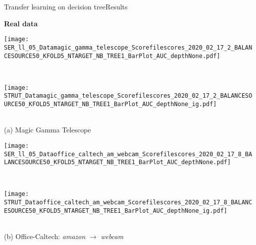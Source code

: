 \begin{frame}{Transfer learning on decision tree}{Results}

\centering
\textbf{Real data}

\renewcommand{\ratio}{1.0}
        \centering
        \begin{minipage}[t]{0.33\linewidth}\vspace{0pt}
            \centering
            \begin{minipage}[t]{\ratio\linewidth}\vspace{0pt}
            \centerline{\texttt{[image: SER\_ll\_05\_Datamagic\_gamma\_telescope\_Scorefilescores\_2020\_02\_17\_2\_BALANCESOURCE50\_KFOLD5\_NTARGET\_NB\_TREE1\_BarPlot\_AUC\_depthNone.pdf]}}
            \end{minipage}\\
            \begin{minipage}[t]{\ratio\linewidth}\vspace{0cm}
            \centerline{\texttt{[image: STRUT\_Datamagic\_gamma\_telescope\_Scorefilescores\_2020\_02\_17\_2\_BALANCESOURCE50\_KFOLD5\_NTARGET\_NB\_TREE1\_BarPlot\_AUC\_depthNone\_ig.pdf]}}
            \end{minipage}\\
            \medskip
            {\small(a)\; Magic Gamma Telescope}
        \end{minipage}\hfill
        \begin{minipage}[t]{0.33\linewidth}\vspace{0pt}
            \centering
            \begin{minipage}[t]{\ratio\linewidth}\vspace{0pt}
            \centerline{\texttt{[image: SER\_ll\_05\_Dataoffice\_caltech\_am\_webcam\_Scorefilescores\_2020\_02\_17\_8\_BALANCESOURCE50\_KFOLD5\_NTARGET\_NB\_TREE1\_BarPlot\_AUC\_depthNone.pdf]}}
            \end{minipage}\\
            \begin{minipage}[t]{\ratio\linewidth}\vspace{0cm}
            \centerline{\texttt{[image: STRUT\_Dataoffice\_caltech\_am\_webcam\_Scorefilescores\_2020\_02\_17\_8\_BALANCESOURCE50\_KFOLD5\_NTARGET\_NB\_TREE1\_BarPlot\_AUC\_depthNone\_ig.pdf]}}
            \end{minipage}\\
            \medskip
            {\small(b)\; Office-Caltech: \emph{amazon} $\rightarrow$ \emph{webcam}}

\end{minipage}
\end{frame}
